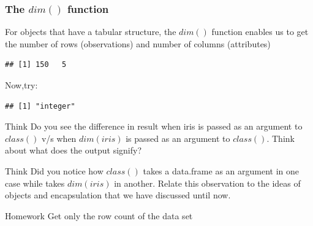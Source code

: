 \documentclass[12pt]{book}\usepackage{knitr}
\begin{document}
\subsubsection{The $dim()$ function}
\noindent For objects that have a tabular structure, the $dim()$ function enables us to get the number of rows (observations) and number of columns (attributes)  
\begin{knitrout}
\color{fgcolor}\begin{kframe}
\begin{alltt}
 
\end{alltt}
\begin{verbatim}
## [1] 150   5
\end{verbatim}
\end{kframe}
\end{knitrout}
\noindent Now,try:
\begin{knitrout}
\color{fgcolor}\begin{kframe}
\begin{alltt}
\hlstd{(} 
\end{alltt}
\begin{verbatim}
## [1] "integer"
\end{verbatim}
\begin{alltt}
\end{alltt}
\end{kframe}
\end{knitrout}
\begin{DIY}{Think}
Do you see the difference in result when iris is passed as an argument to $class()$ v/s when $dim(iris)$ is passed as an argument to $class()$. Think about what does the output signify?   
\end{DIY}

\begin{DIY}{Think}
Did you notice how $class()$ takes a data.frame as an argument in one case while takes $dim(iris)$ in another. Relate this observation to the ideas of objects and encapsulation that we have discussed until now.   
\end{DIY}

\begin{DIY}{Homework}
Get only the row count of the data set
\end{DIY}
\end{document}
